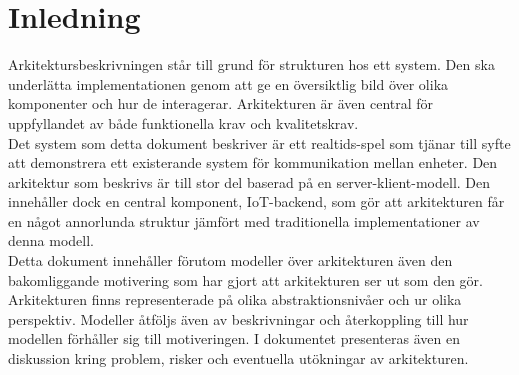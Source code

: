 \section{Inledning}
Arkitektursbeskrivningen står till grund för strukturen hos ett system. Den ska underlätta implementationen genom att ge en översiktlig bild över olika komponenter och hur de interagerar. Arkitekturen är även central för uppfyllandet av både funktionella krav och kvalitetskrav.\\

Det system som detta dokument beskriver är ett realtids-spel som tjänar till syfte att demonstrera ett existerande system för kommunikation mellan enheter. Den arkitektur som beskrivs är till stor del baserad på en server-klient-modell. Den innehåller dock en central komponent, IoT-backend, som gör att arkitekturen får en något annorlunda struktur jämfört med traditionella implementationer av denna modell.\\

Detta dokument innehåller förutom modeller över arkitekturen även den bakomliggande motivering som har gjort att arkitekturen ser ut som den gör. Arkitekturen finns representerade på olika abstraktionsnivåer och ur olika perspektiv. Modeller åtföljs även av beskrivningar och återkoppling till hur modellen förhåller sig till motiveringen. I dokumentet presenteras även en diskussion kring problem, risker och eventuella utökningar av arkitekturen.\\

